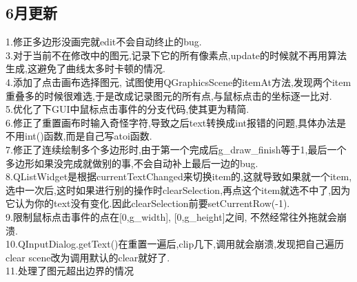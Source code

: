 \documentclass[a4paper,UTF8]{article}
\theoremstyle{definition}
\begin{document}
\subsection{6月更新}
1.修正多边形没画完就edit不会自动终止的bug.\\
3.对于当前不在修改中的图元,记录下它的所有像素点,update的时候就不再用算法生成,这避免了曲线太多时卡顿的情况.\\
4.添加了点击画布选择图元, 试图使用QGraphicsScene的itemAt方法,发现两个item重叠多的时候很难选,于是改成记录图元的所有点,与鼠标点击的坐标逐一比对.\\
5.优化了下GUI中鼠标点击事件的分支代码,使其更为精简.\\
6.修正了重置画布时输入奇怪字符,导致之后text转换成int报错的问题,具体办法是不用int()函数,而是自己写atoi函数.\\
7.修正了连续绘制多个多边形时,由于第一个完成后g\_draw\_finish等于1,最后一个多边形如果没完成就做别的事,不会自动补上最后一边的bug.\\
8.QListWidget是根据currentTextChanged来切换item的,这就导致如果就一个item,选中一次后,这时如果进行别的操作时clearSelection,再点这个item就选不中了,因为它认为你的text没有变化.因此clearSelection前要setCurrentRow(-1).\\
9.限制鼠标点击事件的点在[0,g\_width], [0,g\_height]之间, 不然经常往外拖就会崩溃.\\
10.QInputDialog.getText()在重置一遍后,clip几下,调用就会崩溃,发现把自己遍历clear scene改为调用默认的clear就好了.\\
11.处理了图元超出边界的情况
%

\end{document}
